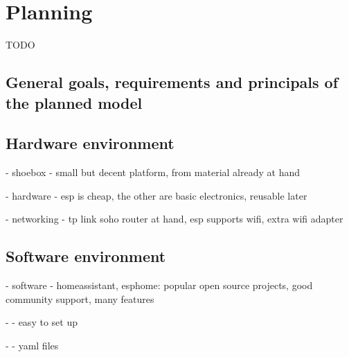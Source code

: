 \chapter{Planning}

TODO
\section{General goals, requirements and principals of the planned model}
\section{Hardware environment}
- shoebox - small but decent platform, from material already at hand

- hardware - esp is cheap, the other are basic electronics, reusable later

- networking - tp link soho router at hand, esp supports wifi, extra wifi adapter
\section{Software environment}
- software - homeassistant, esphome: popular open source projects, good community support, many features

- - easy to set up

- - yaml files

